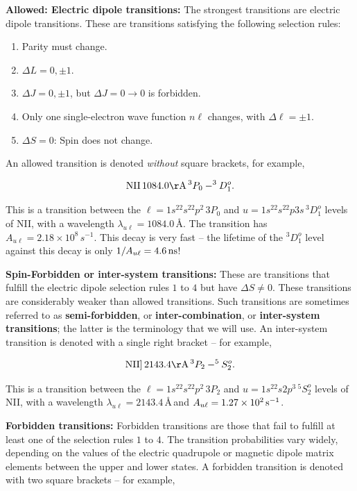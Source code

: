 \documentclass[a4paper,10pt]{article}
\begin{document}
{\noindent}\textbf{Allowed: Electric dipole transitions:} The strongest transitions are electric dipole transitions. These are transitions satisfying the following selection rules:

\begin{enumerate}
    \item Parity must change.
    \item $\Delta L = 0, \pm1$.
    \item $\Delta J = 0, \pm1$, but $\Delta J = 0\rightarrow0$ is forbidden.
    \item Only one single-electron wave function $n\ell$ changes, with $\Delta\ell=\pm1$.
    \item $\Delta S=0$: Spin does not change.
\end{enumerate}

{\noindent}An allowed transition is denoted \textit{without} square brackets, for example,

\begin{align*}
    {\rm NII}\,1084.0{\rm \AA}\,^3P_0-^3D_1^o.
\end{align*}

{\noindent}This is a transition between the $\ell=1s^22s^22p^2\,3P_0$ and $u=1s^22s^22p3s\,^3D_1^o$ levels of NII, with a wavelength $\lambda_{u\ell}=1084.0$\,\AA. The transition has $A_{u\ell}=2.18\times10^8\,{s^{-1}}$. This decay is very fast -- the lifetime of the $^3D_1^o$ level against this decay is only $1/A_{u\ell}=4.6\,{\rm ns}$!

{\noindent}\textbf{Spin-Forbidden or inter-system transitions:} These are transitions that fulfill the electric dipole selection rules $1$ to $4$ but have $\Delta S\neq0$. These transitions are considerably weaker than allowed transitions. Such transitions are sometimes referred to as \textbf{semi-forbidden}, or \textbf{inter-combination}, or \textbf{inter-system transitions}; the latter is the terminology that we will use. An inter-system transition is denoted with a single right bracket -- for example,

\begin{align*}
    {\rm NII]}\,2143.4{\rm \AA}\,^3P_2-^5S_2^o.
\end{align*}

{\noindent}This is a transition between the $\ell=1s^22s^22p^2\,3P_2$ and $u=1s^22s2p^3\,^5S_2^o$ levels of NII, with a wavelength $\lambda_{u\ell}=2143.4$\,\AA\,and $A_{u\ell}=1.27\times10^2\,{\rm s^{-1}}$.

{\noindent}\textbf{Forbidden transitions:} Forbidden transitions are those that fail to fulfill at least one of the selection rules $1$ to $4$. The transition probabilities vary widely, depending on the values of the electric quadrupole or magnetic dipole matrix elements between the upper and lower states. A forbidden transition is denoted with two square brackets -- for example,
\end{document}
